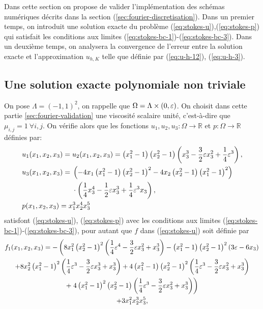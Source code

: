Dans cette section on propose de valider l'implémentation des schémas
numériques décrits dans la section
(\ref{sec:fourier-discretisation}). Dans un premier temps, on
introduit une solution exacte du problème
(\ref{eq:stokes-u}),(\ref{eq:stokes-p}) qui satisfait les conditions
aux limites (\ref{eq:stokes-bc-1})-(\ref{eq:stokes-bc-3}). Dans un
deuxième temps, on analysera la convergence de l'erreur entre la
solution exacte et l'approximation $u_{h,K}$ telle que définie par
(\ref{eq:u-h-12}), (\ref{eq:u-h-3}).

\subsection{Une solution exacte polynomiale non triviale}
On pose $\Lambda = (-1, 1)^2$, on rappelle que $\Omega =
\Lambda\times(0,\varepsilon)$. On choisit dans cette partie
\ref{sec:fourier-validation} une viscosité scalaire unité,
c'est-à-dire que $\mu_{i,j} = 1\ \forall i,j$. On vérifie alors que les
fonctions $u_1, u_2, u_3:\Omega\to\mathbb R$ et $p:\Omega\to\mathbb R$
définies par:
\begin{align}
  &u_1(x_1, x_2, x_3) = u_2(x_1, x_2, x_3) = \parent{x_1^2 - 1} %
  \parent{x_2^2 - 1}
  \parent{x_3^3 - \frac{3}{2}\thickness x_3^2 + \frac{1}{4}\thickness ^3},\label{eq:stokes-exact-sol-1}\\
  &u_3(x_1, x_2, x_3) = %
  \begin{aligned}[t]
    &\parent{-4x_1\parent{x_1^2 - 1} %
                                   \parent{x_2^2 - 1}^2 %
                              -4x_2\parent{x_2^2 - 1} %
                                   \parent{x_1^2 - 1}^2} \\
    &\cdot\parent{\frac{1}{4}x_3^4 - \frac{1}{2}\thickness x_3^3 + \frac{1}{4}\thickness ^3x_3},
  \end{aligned}\label{eq:stokes-exact-sol-2}\\
  &p(x_1, x_2, x_3) = x_1^3 x_2^4 x_3^5\label{eq:stokes-exact-sol-3}
\end{align}
satisfont (\ref{eq:stokes-u}), (\ref{eq:stokes-p}) avec les
conditions aux limites (\ref{eq:stokes-bc-1})-(\ref{eq:stokes-bc-3}),
pour autant que $f$ dans (\ref{eq:stokes-u}) soit définie par
\begin{multline}
  f_1(x_1, x_2, x_3) =
  -\left(
       8x_1^2
       \left( x_2^2 - 1 \right)^2
       \left( \frac{1}{4}\varepsilon ^4 - \frac{3}{2}\varepsilon x_3^2 + x_3^3 \right)
     - \left( x_1^2 - 1 \right)
       \left( x_2^2 - 1 \right)^2
       \left( 3\varepsilon  - 6x_3 \right)
   \right.\\
  + 8x_2^2
  \left( x_1^2-1 \right)^2
  \left( \frac{1}{4} \varepsilon ^3 - \frac{3}{2}\varepsilon x_3^3 + x_3^3 \right)
  + 4\left( x_1^2 - 1 \right)
     \left( x_2^2 - 1 \right)^2
     \left( \frac{1}{4}\varepsilon ^3 -\frac{3}{2} \varepsilon x_3^2 + x_3^3 \right)\\
    + \left.4\left( x_1^2 - 1 \right)^2\left( x_2^2 - 1 \right)
      \left( \frac{1}{4}\varepsilon ^3 - \frac{3}{2} \varepsilon x_3^2 + x_3^3 \right)\right)\\
    + 3x_1^2 x_2^3x_3^5,
\end{multline}
